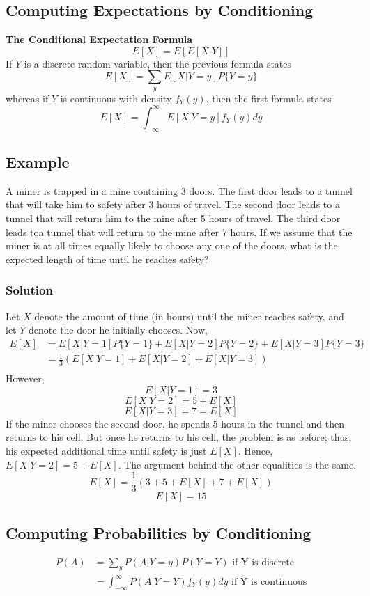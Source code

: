\subsection{Computing Expectations by Conditioning}
\textbf{The Conditional Expectation Formula}
\[E[X] = E[E[X|Y]]\] If $Y$ is a discrete random variable, then the previous formula states \[E[X] = \sum_y E[X|Y=y]P\{Y=y\}\] whereas if $Y$ is continuous with density $f_Y(y)$, then the first formula states \[E[X] = \int^\infty_{-\infty} E[X|Y = y]f_Y(y) dy\]
\subsection*{Example}
A miner is trapped in a mine containing 3 doors. The first door leads to a tunnel that will take him to safety after 3 hours of travel. The second door leads to a tunnel that will return him to the mine after 5 hours of travel. The third door leads toa  tunnel that will return to the mine after 7 hours. If we assume that the miner is at all times equally likely to choose any one of the doors, what is the expected length of time until he reaches safety?
\subsubsection*{Solution}
Let $X$ denote the amount of time (in hours) until the miner reaches safety, and let $Y$ denote the door he initially chooses. Now, 
\begin{equation*}
    \begin{split}
        E[X] &= E[X|Y=1]P\{Y=1\} + E[X|Y=2]P\{Y=2\} + E[X|Y=3]P\{Y=3\}\\
        &= \frac{1}{3}(E[X|Y=1] + E[X|Y=2] + E[X|Y = 3])\\
    \end{split}
\end{equation*}
However, 
\[E[X|Y = 1] = 3\] \[E[X|Y = 2] = 5 + E[X]\] \[E[X|Y = 3] = 7 = E[X]\]
If the miner chooses the second door, he spends 5 hours in the tunnel and then returns to his cell. But once he returns to
his cell, the problem is as before; thus, his expected additional time until safety is just $E[X]$. Hence, $E[X|Y = 2] = 5 + E[X]$. The argument behind the other equalities is the same. \[E[X] = \frac{1}{3}(3 + 5 + E[X] + 7 + E[X])\] \[E[X] = 15\]
\subsection{Computing Probabilities by Conditioning}
\begin{equation*}
    \begin{split}
        P(A) &= \sum_y P(A|Y = y)P(Y = Y) \text{ if Y is discrete }\\
        &= \int^\infty_{-\infty} P(A|Y=Y)f_Y(y) dy \text{ if Y is continuous}
    \end{split}
\end{equation*}
